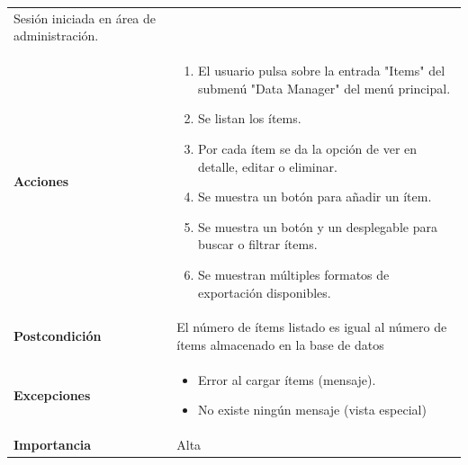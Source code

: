 \documentclass[
]{article}
\providecommand{\tightlist}{%
  \setlength{\itemsep}{0pt}\setlength{\parskip}{0pt}}
\begin{document}
\begin{longtable}[]{@{}ll@{}}
\begin{minipage}[t]{0.73\columnwidth}
Sesión iniciada en área de administración.\strut
\end{minipage}\tabularnewline
\begin{minipage}[t]{0.21\columnwidth}\raggedright
\textbf{Acciones}\strut
\end{minipage} & \begin{minipage}[t]{0.73\columnwidth}\raggedright
\begin{enumerate}
\def\labelenumi{\arabic{enumi}.}
\tightlist
\item
  El usuario pulsa sobre la entrada "Items" del submenú "Data Manager"
  del menú principal.
\item
  Se listan los ítems.
\item
  Por cada ítem se da la opción de ver en detalle, editar o eliminar.
\item
  Se muestra un botón para añadir un ítem.
\item
  Se muestra un botón y un desplegable para buscar o filtrar ítems.
\item
  Se muestran múltiples formatos de exportación disponibles.
\end{enumerate}\strut
\end{minipage}\tabularnewline
\begin{minipage}[t]{0.21\columnwidth}\raggedright
\textbf{Postcondición}\strut
\end{minipage} & \begin{minipage}[t]{0.73\columnwidth}\raggedright
El número de ítems listado es igual al número de ítems almacenado en la
base de datos\strut
\end{minipage}\tabularnewline
\begin{minipage}[t]{0.21\columnwidth}\raggedright
\textbf{Excepciones}\strut
\end{minipage} & \begin{minipage}[t]{0.73\columnwidth}\raggedright
\begin{itemize}
\tightlist
\item
  Error al cargar ítems (mensaje).
\item
  No existe ningún mensaje (vista especial)
\end{itemize}\strut
\end{minipage}\tabularnewline
\begin{minipage}[t]{0.21\columnwidth}\raggedright
\textbf{Importancia}\strut
\end{minipage} & \begin{minipage}[t]{0.73\columnwidth}\raggedright
Alta\strut
\end{minipage}\tabularnewline
\bottomrule
\end{longtable}
\end{document}
